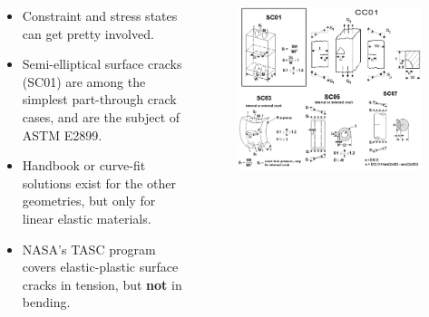 \begin{frame}
\begin{columns}
\begin{column}{0.45\textwidth}
\begin{itemize}
\item Constraint and stress states can get pretty involved.
\item Semi-elliptical surface cracks (SC01) are among the simplest part-through crack cases, and are the subject of ASTM E2899.
\item Handbook or curve-fit solutions exist for the other geometries, but only for linear elastic materials.
\item NASA's TASC program covers elastic-plastic surface cracks in tension, but {\bfseries not} in bending.
\end{itemize}
\end{column}
\begin{column}{0.45\textwidth}
\begin{figure}[tbp]
\centering
\includegraphics[width=\columnwidth]{nasgro-geometries}
\end{figure}
\end{column}
\end{columns}

\end{frame}

